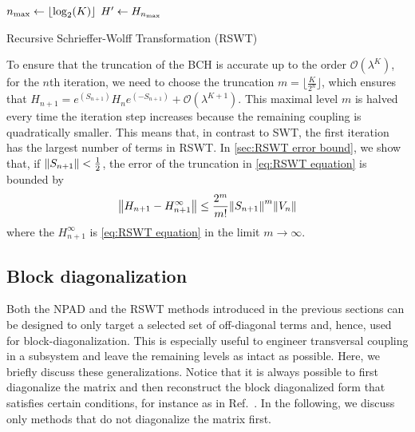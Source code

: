 \documentclass[%
 reprint,
 amsmath,amssymb,
 aps,
pra,
noeprint,
superscriptaddress,
]{revtex4-2}
\begin{document}
\begin{algorithm}
\SetAlgoLined
{}
$n_{\rm{max}} \leftarrow \lfloor \log_2(K)\rfloor$\;
$H' \leftarrow H_{n_{\textnormal{max}}}$
\caption{Recursive Schrieffer-Wolff Transformation (RSWT)}
\label{alg:RSWT}
\end{algorithm}

To ensure that the truncation of the BCH is accurate up to the order $\mathcal{O}(\lambda^{K})$,
for the $n$th iteration, we need to choose the truncation $m = \lfloor\frac{K}{2^{n}} \rfloor$, which ensures that $H_{n+1} = e^{(S_{n+1})}H_{n}e^{(-S_{n+1})} + \mathcal{O}(\lambda^{K+1})$.
This maximal level $m$ is halved every time the iteration step increases because the remaining coupling is quadratically smaller.
This means that, in contrast to SWT, the first iteration has the largest number of terms in RSWT.
In \cref{sec:RSWT error bound}, we show that, if $\norm{S_{n+1}}<\frac{1}{2}$, the error of the truncation in \cref{eq:RSWT equation} is bounded by
\begin{equation}
    \norm{
        H_{n+1} - H_{n+1}^{\infty}
    }
    \le
    \frac{2^{m}}{m!}
    \norm{S_{n+1}}^m
    \norm{V_{n}}
\end{equation}
where the $H_{n+1}^{\infty}$ is \cref{eq:RSWT equation} in the limit $m\rightarrow \infty$.





\subsection{Block diagonalization}
\label{sec:block diagonalization}
Both the NPAD and the RSWT methods introduced in the previous sections can be designed to only target a selected set of off-diagonal terms and, hence, used for block-diagonalization. This is especially useful to engineer transversal coupling in a subsystem and leave the remaining levels as intact as possible. Here, we briefly discuss these generalizations. Notice that it is always possible to first diagonalize the matrix and then reconstruct the block diagonalized form that satisfies certain conditions, for instance as in Ref.~\cite{Cederbaum1989}. In the following, we discuss only methods that do not diagonalize the matrix first.
\end{document}
